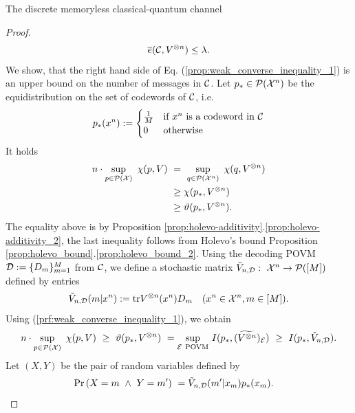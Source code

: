 \begin{section}{The discrete memoryless  classical-quantum channel}
\begin{proof}
       \begin{align}
        \overline{e}({\mathcal C}, V^{\otimes n}) \leq \lambda.
       \end{align}
       We show, that the right hand side of Eq. (\ref{prop:weak_converse_inequality_1}) is an upper bound on the number of messages in ${\mathcal C}$. Let $p_{\ast} \in {\mathcal P}({\mathcal X}^n)$ be the equidistribution on the set of codewords of ${\mathcal C}$, i.e. 
       \begin{align*}
         p_\ast(x^n) := \begin{cases}
             \frac{1}{M} & \text{if}\ x^n \ \text{is a codeword in} \ {\mathcal C} \\
             0              & \text{otherwise}
            \end{cases}
       \end{align*}
	It holds
	\begin{align}
	 n \cdot \sup_{p \in \cP(\cX)} \ \chi(p,V) \ 
	 & = \ \sup_{q \in \cP(\cX^n)}  \ \chi(q,V^{\otimes n}) \nonumber \\
	 & \geq \chi(p_\ast, V^{\otimes n}) \nonumber \\
	 &\geq \vartheta(p_{\ast}, V^{\otimes n}). \label{prf:weak_converse_inequality_1}
	\end{align}
        The equality above is by Proposition \ref{prop:holevo-additivity}.\ref{prop:holevo-additivity_2}, the last inequality follows from Holevo's bound Proposition \ref{prop:holevo_bound}.\ref{prop:holevo_bound_2}.
        Using the decoding POVM ${\mathcal D} := \{D_m\}_{m=1}^M$ from ${\mathcal C}$, we define a stochastic matrix $\tilde{V}_{n, {\mathcal D}}: \ {\mathcal X}^n \rightarrow {\mathcal P}([M])$ defined by entries
        \begin{align*}
            \tilde{V}_{n,{\mathcal D}}(m|x^n) := \mathrm{tr} V^{\otimes n}(x^n)D_m &&( x^n \in {\mathcal X}^n, m \in [M]).
        \end{align*}
        Using (\ref{prf:weak_converse_inequality_1}), we obtain
        \begin{align}
         n \cdot \sup_{p \in \cP(\cX)} \ \chi(p,V) \ \geq \ \vartheta(p_{\ast}, V^{\otimes n}) \ = \underset{\cE \ \text{POVM}}{\sup} \ I(p_{\ast}, (\widetilde{V^{\otimes n}})_{\cE}) \ \geq \ I(p_{\ast}, \tilde{V}_{n,\cD}).
         \label{prf:weak_converse_inequality_2}
        \end{align}
	 Let $(X,Y)$ be the pair of random variables defined by 
	 \begin{align*}
	  \prob\left(X = m \ \wedge \ Y = m' \right) \ 
	  &= \tilde{V}_{n,\cD}(m'|x_m) p_{\ast}(x_m). 
	 \end{align*}

\end{proof}
\end{section}
